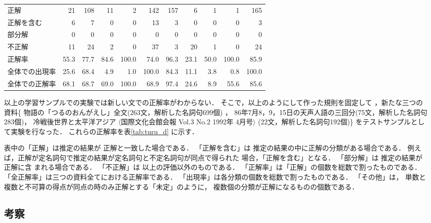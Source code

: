 \begin{table}[t]
\begin{center}
{\begin{tabular}[c]{|l|r|r|r|r|r|r|r|r|r|r|}
   正解   &      21  &    108  &      11  &       2  &  142 &     157  &       6  &       1  &       1  &     165   \\ 
正解を含む&       6  &       7  &       0  &       0  &      13 &       3  &       0  &       0  &       0  &       3   \\ 
  部分解  &       0  &       0  &       0  &       0  &       0   &       0  &       0  &       0  &       0  &       0   \\ 
  不正解  &      11  &      24  &       2  &       0  &      37  &       3  &      20  &       1  &       0  &      24    \\ 
\hline
  正解率   &    55.3  &    77.7  &    84.6  &   100.0  &    74.0   &    96.3  &    23.1  &    50.0  &   100.0  &    85.9   \\ \hline
全体での出現率 &  25.6  &  68.4  &  4.9   &  1.0   &  100.0 &  84.3  &  11.1   &  3.8   &  0.8   &  100.0   \\
全体での正解率 &  68.1   &  68.7 &  69.0 &  100.0  &  68.9  & 97.4 &  24.6  & 8.9  &  55.6  & 85.6  \\ \hline
\end{tabular}
}
\end{center}
\end{table}

以上の学習サンプルでの実験では新しい文での正解率がわからない．
そこで，以上のようにして作った規則を固定して
，新たな三つの資料\{
物語の「つるのおんがえし」\cite{Nakao1985}全文(263文，解析した名詞句699個)
，
86年7月8，9，15日の天声人語の三回分(75文，解析した名詞句283個)，
冷戦後世界と太平洋アジア
$\langle$国際文化会館会報 Vol.3 No.2 1992年 4月号$\rangle$
(22文，解析した名詞句192個)\}
をテストサンプルとして実験を行なった．
これらの正解率を表\ref{tab:turu_d} に示す．

表中の「正解」は推定の結果が
正解と一致した場合である．
「正解を含む」は
推定の結果の中に正解の分類がある場合である．
例えば，正解が定名詞句で推定の結果が定名詞句と不定名詞句が同点で得られた
場合，「正解を含む」となる．
「部分解」は
推定の結果が正解に含
まれる場合である．
「不正解」は
以上の評価以外のものである．
「正解率」は「正解」の個数を総数で割ったものである．
「全正解率」は三つの資料全てにおける正解率である．
「出現率」は各分類の個数を総数で割ったものである．
「その他」は，
単数と複数と不可算の得点が同点の時のみ正解とする「未定」のように，
複数個の分類が正解になるものの個数である．



\subsection{考察}

